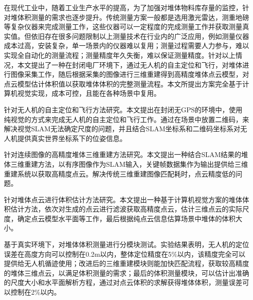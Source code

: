 \begin{cabstract}  
  在现代工业中，随着工业生产水平的提高，为了加强对堆体物料库存量的监控，针对堆体积测量的需求也逐步提升。传统测量方案一般都是选用激光雷达，测重地磅等复杂仪器来完成测量工作，这些仪器可以一定程度的完成测量工作并获取测量真实值。但依旧存在很多问题限制以上测量技术在行业内的广泛应用，例如测量仪器成本过高，安装复杂，单一场景内的仪器难以复用；测量过程需要人力参与，难以实现全自动化的测量流程；测量精度年久失衡，难以保证测量精度。针对以上情况，本文提出了一种在封闭电厂环境下，通过无人机的自主定位和飞行，对堆体进行图像采集工作，随后根据采集的图像进行三维重建得到高精度堆体点云模型，对点云模型估计体积值以获取堆体体积的完整测量流程。本文所提出方案完全基于计算机视觉实现，成本可控，且能在各种场景中复用。
  
  针对无人机的自主定位和飞行方法研究。本文提出在封闭无GPS的环境中，使用纯视觉的方式来完成无人机的自主定位和飞行工作。通过在场景中放置二维码，来解决视觉SLAM无法确定尺度的问题，并且结合SLAM坐标系和二维码坐标系对无人机提供真实世界坐标系下的位姿信息。
  
  针对连续图像的高精度堆体三维重建方法研究。本文提出一种结合SLAM结果的堆体三维重建方法，以有序图像作为SLAM输入，关键帧数据集作为输出提供给三维重建系统以获取高精度点云。解决传统三维重建图像匹配耗时，点云精度低的问题。
  
  针对堆体点云进行体积估计方法研究。本文提出一种基于计算机视觉方案的堆体体积估计方法，依次对生成的点云进行滤波获取高精度点云，估计三维点云的实际尺度，确定点云模型水平面等工作，最后根据纯点云信息估算场景中堆体的体积大小。
  
  基于真实环境下，对堆体体积测量进行分模块测试。实验结果表明，无人机的定位误差在高度方向可以控制在0.2m以内，整体定位精度在5$\%$以内，该精度完全可以提供给无人机循迹使用；改进后的三维重建模块则能加快匹配流程，获取较高精度的堆体三维点云，以满足体积测量的需求；最后的体积测量模块，可以估计出准确的尺度大小和水平面解析方程，通过对点云体积的求解获得堆体体积，测量误差可以控制在2$\%$以内。
\end{cabstract}


